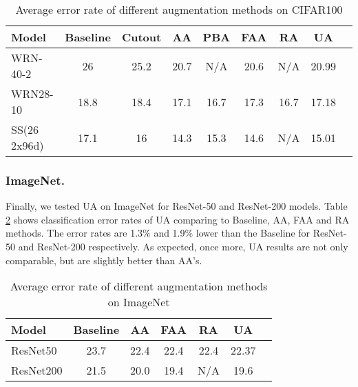 \documentclass[runningheads]{llncs}
\begin{document}
	\begin{table} [htb]
		\begin{center}
			\caption{Average error rate of different augmentation methods on CIFAR100}
			\label{table:headings2}
			\begin{tabular}{l | cccccc|cl}
				\hline Model & Baseline & Cutout  & AA  & PBA  & FAA  & RA  & {UA}\\
\hline \hline \small WRN-40-2  & 26  & 25.2 & 20.7 & N/A & 20.6 & N/A & {20.99}\\
				\small WRN28-10 & 18.8 & 18.4 & 17.1 & 16.7 & 17.3 & 16.7 & {17.18}\\
				\small SS(26 2x96d) & 17.1 & 16 & 14.3 & 15.3 & 14.6 & N/A & {15.01}\\
				\hline
			\end{tabular}
		\end{center}
	\end{table}
	
	
	\subsubsection{ImageNet.}
	Finally, we tested UA on ImageNet for ResNet-50 \cite{resnet50} and ResNet-200 \cite{resnet200} models. Table \ref{table:headings3} shows classification error rates of UA comparing to Baseline, AA, FAA and RA methods. The error rates are 1.3\% and 1.9\% lower than the Baseline for ResNet-50 and ResNet-200 respectively.  As expected, once more, UA results are not only comparable, but are slightly better than AA's. 


	\begin{table} [htb]
		\begin{center}
			\caption{Average error rate of different augmentation methods on ImageNet}
			\label{table:headings3}
			\begin{tabular}{l | cccc|cl}
				\hline Model & Baseline & AA  & FAA  & RA & {UA}\\
\hline \hline ResNet50  & 23.7  & 22.4 & 22.4  & 22.4 & {22.37}\\
				ResNet200  & 21.5  & 20.0 & 19.4 & N/A & {19.6}\\
				\hline
			\end{tabular}
		\end{center}
	\end{table}
	
\end{document}
